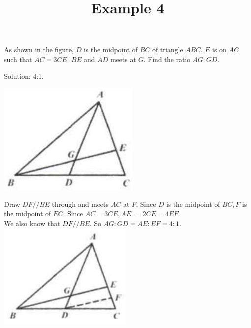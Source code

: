 \documentclass{article}
\title{Example 4}
\date{}
\begin{document}
\maketitle

As shown in the figure, \(D\) is the midpoint of \(B C\) of triangle \(A B C\). \(E\) is on \(A C\) such that \(A C=3 C E\). \(B E\) and \(A D\) meets at \(G\). Find the ratio \(A G: G D\).

Solution: 4:1.
\begin{center}
\includegraphics[width=\textwidth]{images/problem_image_1.jpg}
\end{center}

Draw \(D F / / B E\) through and meets \(A C\) at \(F\). Since \(D\) is the midpoint of \(B C, F\) is the midpoint of \(E C\). Since \(A C=3 C E, A E\) \(=2 C E=4 E F\).\\
We also know that \(D F / / B E\). So \(A G: G D=A E: E F=4: 1\).\\
\centering
\includegraphics[width=\textwidth]{images/reasoning_image_1.jpg}
\end{document}
